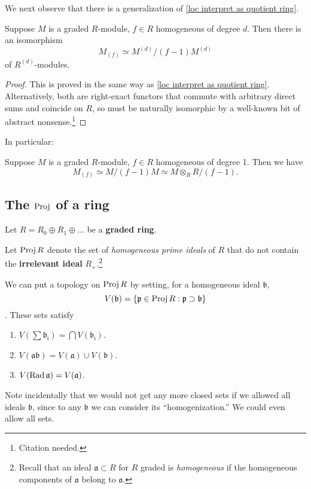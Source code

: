 We next observe that there is a generalization of \cref{loc interpret as quotient ring}.
\begin{proposition} \label{loc
module as quotient}
Suppose $M$ is a graded $R$-module, $f \in R$ homogeneous of degree $d$. Then
there is  an isomorphism
\[ M_{(f)} \simeq M^{(d)}/(f-1)M^{(d)}  \]
of $R^{(d)}$-modules.
\end{proposition}
\begin{proof} 
This is proved in the same way as \cref{loc interpret as quotient
ring}. Alternatively, both are right-exact functors that commute with
arbitrary direct sums and coincide on $R$, so must be naturally isomorphic by
a well-known bit of abstract nonsense.\footnote{Citation needed.} 
\end{proof} 

In particular:
\begin{corollary} 
Suppose $M$ is a graded $R$-module, $f \in R$ homogeneous of degree 1. Then we
have
\[  M_{(f)} \simeq M/(f-1)M \simeq M\otimes_R R/(f-1).  \]
\end{corollary} 

\subsection{The $\operatorname{Proj}$ of a ring}
Let $R=R_0 \oplus R_1 \oplus \dots$ be a \textbf{graded ring}.

\begin{definition} 
Let $\operatorname{Proj} R$ denote the set of \emph{homogeneous prime ideals} of
$R$ that do not contain the \textbf{irrelevant ideal} $R_+$.\footnote{Recall that an ideal $\mathfrak{a} \subset R$ for $R$ graded is
\emph{homogeneous} if the homogeneous components of $\mathfrak{a}$ belong to
$\mathfrak{a}$.}

\end{definition} 

We can put a topology on $\operatorname{Proj} R$ by setting, for a homogeneous ideal
$\mathfrak{b}$, $$V(\mathfrak{b}) = \{ \mathfrak{p} \in \operatorname{Proj} R:
\mathfrak{p} \supset \mathfrak{b}\}$$.  These sets satisfy
\begin{enumerate}
\item $V( \sum \mathfrak{b_i}) = \bigcap V(\mathfrak{b_i})$.
\item  $V( \mathfrak{a}\mathfrak{b}) = V(\mathfrak{a}) \cup V(\mathfrak{b})$.
\item  $V( \operatorname{Rad} \mathfrak{a}) = V(\mathfrak{a})$.
\end{enumerate}
Note incidentally that we would not get any more closed sets if we allowed all
ideals $\mathfrak{b}$, since to any $\mathfrak{b}$ we can consider its ``homogenization.''
We could even allow all sets.

